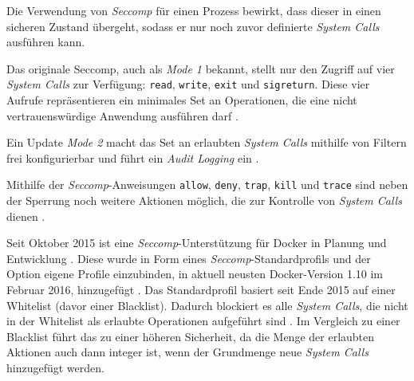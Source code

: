 \documentclass[../main.tex]{subfiles}
\begin{document}
			Die Verwendung von \emph{Seccomp} für einen Prozess bewirkt, dass dieser in einen \glqq{}sicheren\grqq{} Zustand übergeht, sodass er nur noch zuvor definierte \emph{System Calls} ausführen kann.



			Das originale Seccomp, auch als \emph{Mode 1} bekannt, stellt nur den Zugriff auf vier \emph{System Calls} zur Verfügung: \texttt{read}, \texttt{write}, \texttt{exit} und \texttt{sigreturn}. Diese vier Aufrufe repräsentieren ein minimales Set an Operationen, die eine nicht vertrauenswürdige Anwendung ausführen darf \cite{linuxSecOverview}.

			Ein Update \emph{Mode 2} macht das Set an erlaubten \emph{System Calls} mithilfe von Filtern frei konfigurierbar und führt ein \emph{Audit Logging} ein	\cite{linuxSecOverview}\cite{seccompGitDesc}.

			Mithilfe der \emph{Seccomp}-Anweisungen \texttt{allow}, \texttt{deny}, \texttt{trap}, \texttt{kill} und \texttt{trace} sind neben der Sperrung noch weitere Aktionen möglich, die zur Kontrolle von \emph{System Calls} dienen \cite{docker110Security}.

			Seit Oktober 2015 ist eine \emph{Seccomp}-Unterstützung für Docker in Planung und Entwicklung \cite{githubGeneralSecProfiles}\cite{githubSeccompIntegration}. Diese wurde in Form eines \emph{Seccomp}-Standardprofils und der Option eigene Profile einzubinden, in aktuell neusten Docker-Version 1.10 im Februar 2016, hinzugefügt \cite{githubDockerChangelog}\cite{githubSeccompDoc}\cite{githubSeccompProfile}\cite{docker110Security}. Das Standardprofil basiert seit Ende 2015 auf einer Whitelist (davor einer Blacklist). Dadurch blockiert es alle \emph{System Calls}, die nicht in der Whitelist als erlaubte Operationen aufgeführt sind \cite{githubSeccompDoc}. Im Vergleich zu einer Blacklist führt das zu einer höheren Sicherheit, da die Menge der erlaubten Aktionen auch dann integer ist, wenn der Grundmenge neue \emph{System Calls}  hinzugefügt werden.
\end{document}

